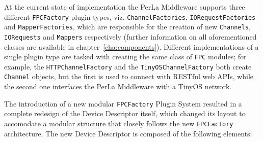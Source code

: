 At the current state of implementation the PerLa Middleware supports three
different \texttt{FPCFactory} plugin types, viz. \texttt{ChannelFactories},
\texttt{IORequestFactories} and \texttt{MapperFactories}, which are responsible
for the creation of new \texttt{Channels}, \texttt{IORequests} and
\texttt{Mappers} respectively (further information on all aforementioned
classes are available in chapter~\ref{cha:components}). Different
implementations of a single plugin type are tasked with creating the same class
of \texttt{FPC} modules; for example, the \texttt{HTTPChannelFactory} and the
\texttt{TinyOSChannelFactory} both create \texttt{Channel} objects, but the
first is used to connect with RESTful web APIs, while the second one interfaces
the PerLa Middleware with a TinyOS network.

The introduction of a new modular \texttt{FPCFactory} Plugin System resulted in
a complete redesign of the Device Descriptor itself, which changed its layout
to accomodate a modular structure that closely follows the new
\texttt{FPCFactory} architecture. The new Device Descriptor is composed of the
following elements:

